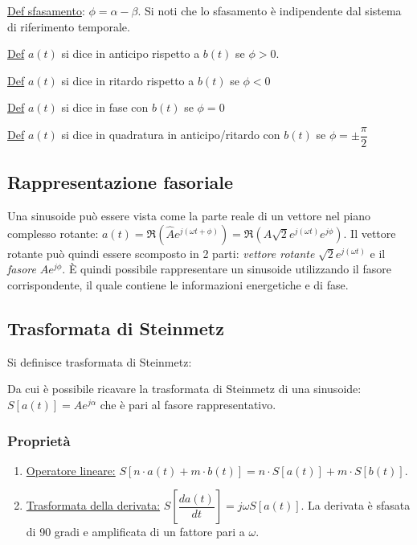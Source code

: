 \documentclass{article}
\begin{document}
\noindent \underline{Def sfasamento}: $\phi = \alpha - \beta$. Si noti che lo sfasamento è indipendente dal sistema di riferimento temporale.

\noindent \underline{Def} $a(t)$ si dice in anticipo rispetto a $b(t)$ se $\phi>0$.

\noindent \underline{Def} $a(t)$ si dice in ritardo rispetto a $b(t)$ se $\phi<0$

\noindent \underline{Def} $a(t)$ si dice in fase con $b(t)$ se $\phi=0$

\noindent \underline{Def} $a(t)$ si dice in quadratura in anticipo/ritardo con $b(t)$ se $\phi=\pm \dfrac{\pi}{2}$

\subsection{Rappresentazione fasoriale}
\noindent Una sinusoide può essere vista come la parte reale di un vettore nel piano complesso rotante:
$a(t)=\Re(\hat{A}e^{j(\omega t + \phi)})=\Re(A\sqrt{2}e^{j(\omega t)}e^{j\phi})$. Il vettore rotante può quindi essere scomposto in 2 parti:
\textit{vettore rotante} $\sqrt{2}e^{j(\omega t)}$ e il \textit{fasore} $Ae^{j\phi}$. È quindi possibile rappresentare un sinusoide utilizzando 
il fasore corrispondente, il quale contiene le informazioni energetiche e di fase.

\subsection{Trasformata di Steinmetz}
\noindent Si definisce trasformata di Steinmetz:

\medskip
\noindent{}

\noindent Da cui è possibile ricavare la trasformata di Steinmetz di una sinusoide: $S[a(t)]=Ae^{j\alpha}$ che è pari 
al fasore rappresentativo.

\subsubsection{Proprietà}
\begin{enumerate}
    \item \underline{Operatore lineare:} $S[n\cdot a(t)+m\cdot b(t)]=n\cdot S[a(t)]+m\cdot S[b(t)]$.
    \item \underline{Trasformata della derivata:} $S[\dfrac{d a(t)}{dt}]=j\omega S[a(t)]$. La derivata è sfasata di 90 gradi e 
    amplificata di un fattore pari a $\omega$.
\end{enumerate}
\end{document}
